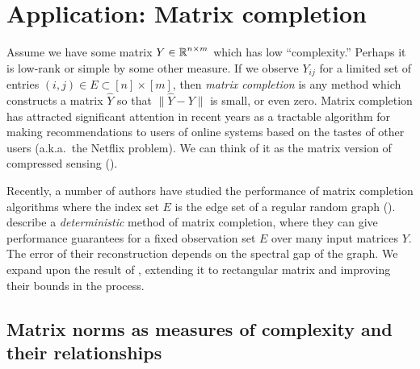 \section{Application: Matrix completion}
\label{sec:matrix_completion}

Assume we have some matrix $Y \in \operatorname{\mathbb{R}}^{n \times m}$ 
which has low ``complexity.'' 
Perhaps it is low-rank or simple by some other measure.
If we observe $Y_{ij}$ for a limited set of entries
$(i,j) \in E \subset [n] \times [m]$,
then {\it matrix completion} is any method which
constructs a matrix $\hat{Y}$
so that $\| \hat{Y} - Y\|$ is small, or even zero.
Matrix completion has attracted significant attention in recent years as a tractable
algorithm for making recommendations to users of online systems based on the
tastes of other users (a.k.a.\ the Netflix problem).
We can think of it as the matrix version of 
compressed sensing (\citet*{candes2010, candes2010a}).

Recently, a number of authors have studied the performance of 
matrix completion algorithms where the index set $E$ is the edge
set of a regular random graph 
(\citet*{heiman2014, bhojanapalli2014,gamarnik2017}).
\citet*{heiman2014} describe a 
{\it deterministic} method of matrix completion,
where they can give performance guarantees for a fixed observation set $E$ 
over many input matrices $Y$.
The error of their reconstruction depends on the spectral gap of the graph.
We expand upon the result of \citet*{heiman2014}, 
extending it to rectangular matrix and improving their bounds in the process.

\subsection{Matrix norms as measures of complexity and their relationships}

